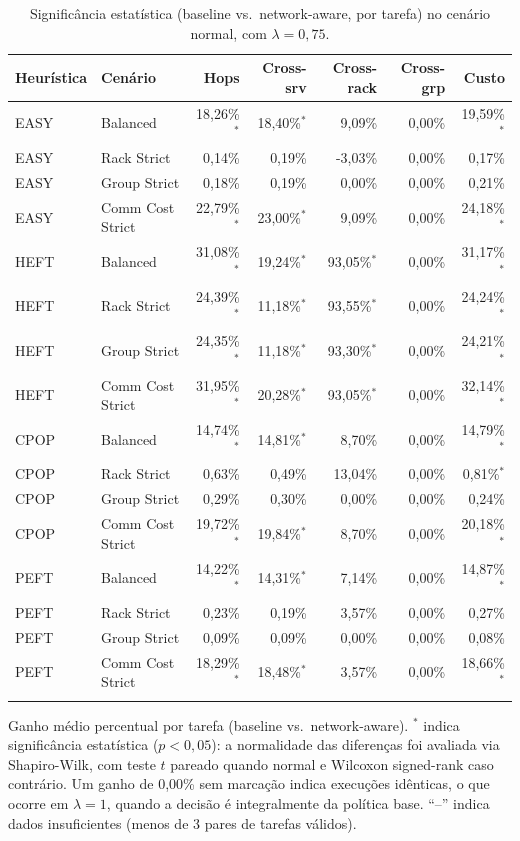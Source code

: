 \begin{table}[htbp]
\centering
\small
\caption{Significância estatística (baseline vs.\ network-aware, por tarefa) no cenário normal, com $\lambda = 0{,}75$.}
\label{tab:significancia_normal_lambda_075}
\begin{tabular}{llrrrrr}
\toprule
Heurística & Cenário & Hops & Cross-srv & Cross-rack & Cross-grp & Custo \\
\midrule
EASY & Balanced & 18,26\%$^{*}$ & 18,40\%$^{*}$ & 9,09\% & 0,00\% & 19,59\%$^{*}$ \\
EASY & Rack Strict & 0,14\% & 0,19\% & -3,03\% & 0,00\% & 0,17\% \\
EASY & Group Strict & 0,18\% & 0,19\% & 0,00\% & 0,00\% & 0,21\% \\
EASY & Comm Cost Strict & 22,79\%$^{*}$ & 23,00\%$^{*}$ & 9,09\% & 0,00\% & 24,18\%$^{*}$ \\
\addlinespace
HEFT & Balanced & 31,08\%$^{*}$ & 19,24\%$^{*}$ & 93,05\%$^{*}$ & 0,00\% & 31,17\%$^{*}$ \\
HEFT & Rack Strict & 24,39\%$^{*}$ & 11,18\%$^{*}$ & 93,55\%$^{*}$ & 0,00\% & 24,24\%$^{*}$ \\
HEFT & Group Strict & 24,35\%$^{*}$ & 11,18\%$^{*}$ & 93,30\%$^{*}$ & 0,00\% & 24,21\%$^{*}$ \\
HEFT & Comm Cost Strict & 31,95\%$^{*}$ & 20,28\%$^{*}$ & 93,05\%$^{*}$ & 0,00\% & 32,14\%$^{*}$ \\
\addlinespace
CPOP & Balanced & 14,74\%$^{*}$ & 14,81\%$^{*}$ & 8,70\% & 0,00\% & 14,79\%$^{*}$ \\
CPOP & Rack Strict & 0,63\% & 0,49\% & 13,04\% & 0,00\% & 0,81\%$^{*}$ \\
CPOP & Group Strict & 0,29\% & 0,30\% & 0,00\% & 0,00\% & 0,24\% \\
CPOP & Comm Cost Strict & 19,72\%$^{*}$ & 19,84\%$^{*}$ & 8,70\% & 0,00\% & 20,18\%$^{*}$ \\
\addlinespace
PEFT & Balanced & 14,22\%$^{*}$ & 14,31\%$^{*}$ & 7,14\% & 0,00\% & 14,87\%$^{*}$ \\
PEFT & Rack Strict & 0,23\% & 0,19\% & 3,57\% & 0,00\% & 0,27\% \\
PEFT & Group Strict & 0,09\% & 0,09\% & 0,00\% & 0,00\% & 0,08\% \\
PEFT & Comm Cost Strict & 18,29\%$^{*}$ & 18,48\%$^{*}$ & 3,57\% & 0,00\% & 18,66\%$^{*}$ \\
\addlinespace
\bottomrule
\end{tabular}

\vspace{2mm}
\footnotesize Ganho médio percentual por tarefa (baseline vs.\ network-aware). $^{*}$ indica significância estatística ($p<0{,}05$): a normalidade das diferenças foi avaliada via Shapiro-Wilk, com teste $t$ pareado quando normal e Wilcoxon signed-rank caso contrário. Um ganho de 0,00\% sem marcação indica execuções idênticas, o que ocorre em $\lambda = 1$, quando a decisão é integralmente da política base. ``--'' indica dados insuficientes (menos de 3 pares de tarefas válidos).
\end{table}
